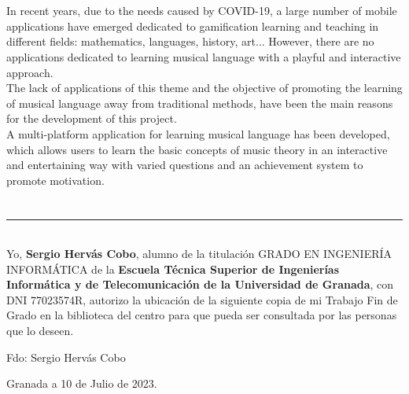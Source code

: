 \\

\vspace{0.7cm}
\\

In recent years, due to the needs caused by COVID-19, a large number of mobile applications have emerged dedicated to gamification learning and teaching in different fields: mathematics, languages, history, art... 
However, there are no applications dedicated to learning musical language with a playful and interactive approach.\\

The lack of applications of this theme and the objective of promoting the learning of musical language away from traditional methods, have been the main reasons for the development of this project.\\

A multi-platform application for learning musical language has been developed, which allows users to learn the basic concepts of music theory in an interactive and entertaining way with varied questions and an achievement system to promote motivation.



\chapter*{}
\thispagestyle{empty}

\noindent\rule[-1ex]{\textwidth}{2pt}\\[4.5ex]

Yo, \textbf{Sergio Hervás Cobo}, alumno de la titulación GRADO EN INGENIERÍA INFORMÁTICA de la \textbf{Escuela Técnica Superior
de Ingenierías Informática y de Telecomunicación de la Universidad de Granada}, con DNI 77023574R, autorizo la
ubicación de la siguiente copia de mi Trabajo Fin de Grado en la biblioteca del centro para que pueda ser
consultada por las personas que lo deseen.

\vspace{6cm}

\noindent Fdo: Sergio Hervás Cobo

\vspace{2cm}

\begin{flushright}
Granada a 10 de Julio de 2023.
\end{flushright}


